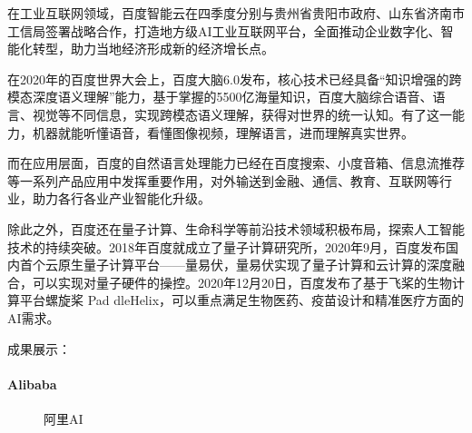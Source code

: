 \documentclass[letterpaper,10pt,english]{sphinxmanual}
\begin{document}
在工业互联网领域，百度智能云在四季度分别与贵州省贵阳市政府、山东省济南市工信局签署战略合作，打造地方级AI工业互联网平台，全面推动企业数字化、智能化转型，助力当地经济形成新的经济增长点。
%
\begin{footnote}[733]\sphinxAtStartFootnote
{}
%
\end{footnote}

在2020年的百度世界大会上，百度大脑6.0发布，核心技术已经具备“知识增强的跨模态深度语义理解”能力，基于掌握的5500亿海量知识，百度大脑综合语音、语言、视觉等不同信息，实现跨模态语义理解，获得对世界的统一认知。有了这一能力，机器就能听懂语音，看懂图像视频，理解语言，进而理解真实世界。

而在应用层面，百度的自然语言处理能力已经在百度搜索、小度音箱、信息流推荐等一系列产品应用中发挥重要作用，对外输送到金融、通信、教育、互联网等行业，助力各行各业产业智能化升级。

除此之外，百度还在量子计算、生命科学等前沿技术领域积极布局，探索人工智能技术的持续突破。2018年百度就成立了量子计算研究所，2020年9月，百度发布国内首个云原生量子计算平台——量易伏，量易伏实现了量子计算和云计算的深度融合，可以实现对量子硬件的操控。2020年12月20日，百度发布了基于飞桨的生物计算平台\sphinxhyphen{}螺旋桨
Pad
dleHelix，可以重点满足生物医药、疫苗设计和精准医疗方面的AI需求。%
\begin{footnote}[734]\sphinxAtStartFootnote
{}
%
\end{footnote}

\begin{center}\end{center} 

成果展示：


\paragraph{Alibaba}
\label{\detokenize{chapter_project/AI_company:alibaba}}
\begin{figure}[H]
\centering
\capstart

\noindent{}
\caption{阿里AI\sphinxfootnotemark[735]}\label{\detokenize{chapter_project/AI_company:id22}}\end{figure}
%
\begin{footnotetext}[735]\sphinxAtStartFootnote
{}
%
\end{footnotetext}\ignorespaces 
\end{document}
